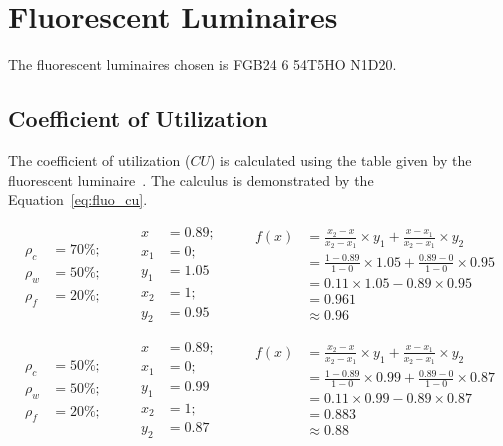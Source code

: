 \chapter{Fluorescent Luminaires}

The fluorescent luminaires chosen is FGB24 6 54T5HO N1D20.

\section{Coefficient of Utilization}
The coefficient of utilization ($CU$) is calculated using the table given by the fluorescent luminaire~\cite{www:fluo_photometric}. The calculus is demonstrated by the Equation~\ref{eq:fluo_cu}.

\begin{equation*}
\begin{split}
\rho_c &= 70\%; \\
\rho_w &= 50\%; \\
\rho_f &= 20\%;
\end{split}
\qquad
\begin{split}
x &= 0.89; \\
x_1 &= 0; \\ y_1 &= 1.05 \\
x_2 &= 1; \\ y_2 &= 0.95
\end{split}
\qquad
\begin{split}
f(x) &= \frac{x_2 - x}{x_2 - x_1} \times y_1 +
       \frac{x - x_1}{x_2 - x_1} \times y_2 \\
 &= \frac{1 - 0.89}{1 - 0} \times 1.05 +
    \frac{0.89 - 0}{1 - 0} \times 0.95 \\
 & = 0.11 \times 1.05 - 0.89 \times 0.95 \\
 & = 0.961 \\
 & \approx 0.96
\end{split}
\label{eq:fluo_cu_interpol_1}
\end{equation*}

\begin{equation*}
\begin{split}
\rho_c &= 50\%; \\
\rho_w &= 50\%; \\
\rho_f &= 20\%;
\end{split}
\qquad
\begin{split}
x &= 0.89; \\
x_1 &= 0; \\ y_1 &= 0.99 \\
x_2 &= 1; \\ y_2 &= 0.87
\end{split}
\qquad
\begin{split}
f(x) &= \frac{x_2 - x}{x_2 - x_1} \times y_1 +
       \frac{x - x_1}{x_2 - x_1} \times y_2 \\
 &= \frac{1 - 0.89}{1 - 0} \times 0.99 +
    \frac{0.89 - 0}{1 - 0} \times 0.87 \\
 & = 0.11 \times 0.99 - 0.89 \times 0.87 \\
 & = 0.883 \\
 & \approx 0.88
\end{split}
\label{eq:fluo_cu_interpol_2}
\end{equation*}

